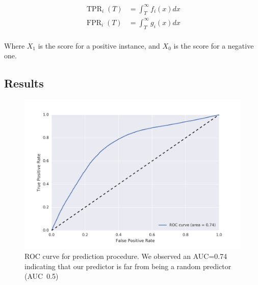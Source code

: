 
\vspace{-1em}

\begin{align*}
\operatorname{TPR}_i(T) &= \int^{\infty}_T f_i(x) dx \\
\operatorname{FPR}_i(T) &= \int^{\infty}_T g_i(x) dx \\
\end{align*}

\vspace{-1.5em}



Where $ X_1 $ is the score for a positive instance, and $ X_0 $ is the score for a negative one.

\subsection{Results}

\begin{figure}[H]
\begin{center}
\includegraphics[width=\columnwidth]{figures/ROC_BETA/ROC_Beta_based_approach_201504.png}
\caption{ROC curve for prediction procedure. We observed an AUC=0.74 indicating that our predictor is far from being a random predictor (AUC~0.5)}
\label{ROC_multiclass}
\end{center}
\end{figure}

